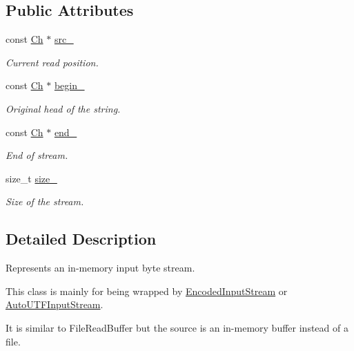 \subsection*{Public Attributes}
\begin{DoxyCompactItemize}
\item 
const \hyperlink{structMemoryStream_a62a1cbd052c325c83dbdb387d2f89088}{Ch} $\ast$ \hyperlink{structMemoryStream_a57cf6cb5766e931a62928b9f92507443}{src\+\_\+}
\begin{DoxyCompactList}\small\item\em Current read position. \end{DoxyCompactList}\item 
const \hyperlink{structMemoryStream_a62a1cbd052c325c83dbdb387d2f89088}{Ch} $\ast$ \hyperlink{structMemoryStream_a91f0767b4f0ed2476d835e8344848a2f}{begin\+\_\+}
\begin{DoxyCompactList}\small\item\em Original head of the string. \end{DoxyCompactList}\item 
const \hyperlink{structMemoryStream_a62a1cbd052c325c83dbdb387d2f89088}{Ch} $\ast$ \hyperlink{structMemoryStream_a55fb302ba0492419757e3ba318c8c654}{end\+\_\+}
\begin{DoxyCompactList}\small\item\em End of stream. \end{DoxyCompactList}\item 
size\+\_\+t \hyperlink{structMemoryStream_ab26a1b5c6d5e8f52c0f6982feba47f36}{size\+\_\+}
\begin{DoxyCompactList}\small\item\em Size of the stream. \end{DoxyCompactList}\end{DoxyCompactItemize}


\subsection{Detailed Description}
Represents an in-\/memory input byte stream. 

This class is mainly for being wrapped by \hyperlink{classEncodedInputStream}{Encoded\+Input\+Stream} or \hyperlink{classAutoUTFInputStream}{Auto\+U\+T\+F\+Input\+Stream}.

It is similar to File\+Read\+Buffer but the source is an in-\/memory buffer instead of a file.

